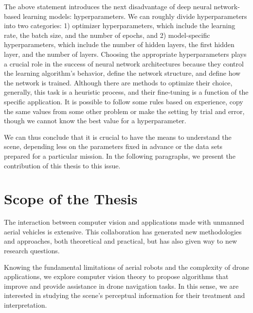The above statement introduces the next disadvantage of deep neural network-based learning models: hyperparameters. We can roughly divide hyperparameters into two categories: 1) optimizer hyperparameters, which include the learning rate, the batch size, and the number of epochs, and 2) model-specific hyperparameters, which include the number of hidden layers, the first hidden layer, and the number of layers. Choosing the appropriate hyperparameters plays a crucial role in the success of neural network architectures because they control the learning algorithm's behavior, define the network structure, and define how the network is trained. Although there are methods to optimize their choice, generally, this task is a heuristic process, and their fine-tuning is a function of the specific application. It is possible to follow some rules based on experience, copy the same values from some other problem or make the setting by trial and error, though we cannot know the best value for a hyperparameter.

We can thus conclude that it is crucial to have the means to understand the scene, depending less on the parameters fixed in advance or the data sets prepared for a particular mission. In the following paragraphs, we present the contribution of this thesis to this issue.



\section*{Scope of the Thesis}

The interaction between computer vision and applications made with unmanned aerial vehicles is extensive. This collaboration has generated new methodologies and approaches, both theoretical and practical, but has also given way to new research questions. 

Knowing the fundamental limitations of aerial robots and the complexity of drone applications, we explore computer vision theory to propose algorithms that improve and provide assistance in drone navigation tasks. In this sense, we are interested in studying the scene's perceptual information for their treatment and interpretation.

